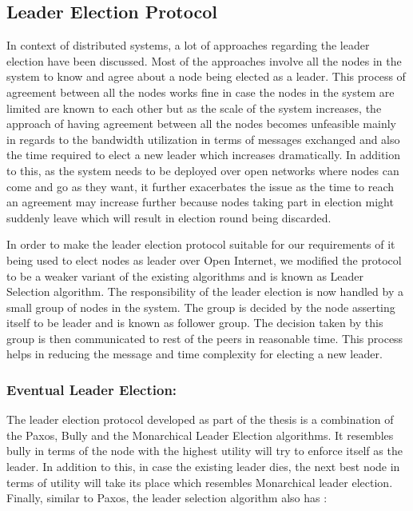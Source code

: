 \documentclass[12pt,a4paper,twoside,openright]{book}
\begin{document}
\subsection{Leader Election Protocol}
\label{ssec:leaderElection}


In context of distributed systems, a lot of approaches regarding the leader election have been discussed. Most of the approaches involve all the nodes in the system to know and agree about a node being elected as a leader. This process of agreement between all the nodes works fine in case the nodes in the system are limited are known to each other but as the scale of the system increases, the approach of having agreement between all the nodes becomes unfeasible mainly in regards to the bandwidth utilization in terms of messages exchanged and also the time required to elect a new leader which increases dramatically. In addition to this, as the system needs to be deployed over open networks where nodes can come and go as they want, it further exacerbates the issue as the time to reach an agreement may increase further because nodes taking part in election might suddenly leave which will result in election round being discarded.
\par In order to make the leader election protocol suitable for our requirements of it being used to elect nodes as leader over Open Internet, we modified the protocol to be a weaker variant of the existing algorithms and is known as Leader Selection algorithm. The responsibility of the leader election is now handled by a small group of nodes in the system. The group is decided by the node asserting itself to be leader and is known as follower group. The decision taken by this group is then communicated to rest of the peers in reasonable time. This process helps in reducing the message and time complexity for electing a new leader. 



\subsubsection{Eventual Leader Election:}

The leader election protocol developed as part of the thesis is a combination of the Paxos\cite{lamportPaxos}, Bully\cite{bully} and the Monarchical Leader Election\cite{guerraoui} algorithms. It resembles bully in terms of the node with the highest utility will try to enforce itself as the leader. In addition to this, in case the existing leader dies, the next best node in terms of utility will take its place which resembles Monarchical leader election. Finally, similar to Paxos, the leader selection algorithm also has :
\end{document}
